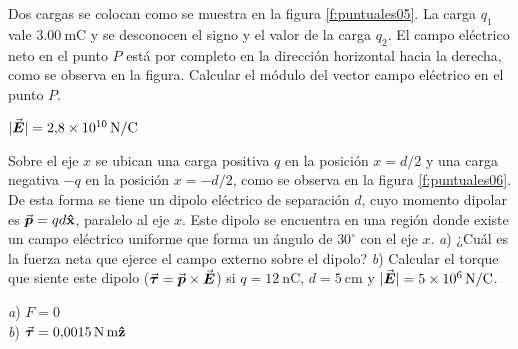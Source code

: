 %
\begin{Exercise}\label{p:puntuales05}
  Dos cargas se colocan como se muestra en la figura \ref{f:puntuales05}. La carga $q_1$ vale $\SI{3.00}{\milli\coulomb}$ y se desconocen el signo y el valor de la carga $q_2$. El campo eléctrico neto en el punto $P$ está por completo en la dirección horizontal hacia la derecha, como se observa en la figura. Calcular el módulo del vector campo eléctrico en el punto $P$.
\end{Exercise}
\begin{Answer}
  $|\va*{E}| = \SI{2.8E10}{\newton/\coulomb}$
\end{Answer}
%
\begin{Exercise}\label{p:puntuales06}
  Sobre el eje $x$ se ubican una carga positiva $q$ en la posición $x = d/2$ y una carga negativa $-q$ en la posición $x = -d/2$, como se observa en la figura \ref{f:puntuales06}. De esta forma se tiene un dipolo eléctrico de separación $d$, cuyo momento dipolar es $\va*{p}=qd\vu{x}$, paralelo al eje $x$. Este dipolo se encuentra en una región donde existe un campo eléctrico uniforme que forma un ángulo de $30^\circ$ con el eje $x$. \textit{a}) ¿Cuál es la fuerza neta que ejerce el campo externo sobre el dipolo? \textit{b}) Calcular el torque que siente este dipolo ($\va*{\tau} = \va*{p} \times \va*{E}$) si $q = \SI{12}{\nano\coulomb}$, $d = \SI{5}{\centi\metre}$ y $|\va*{E}| = \SI{5E6}{\newton/\coulomb}$.
\end{Exercise}
\begin{Answer}
  \begin{minipage}[t]{.4\textwidth}
    \textit{a}) $F = 0$\\ \textit{b}) $\va*{\tau} = \SI{0.0015}{\newton.\metre}\vu{z}$
  \end{minipage}
\end{Answer}
%
\begin{minipage}[t]{.5\textwidth}
  \begin{center}
  \end{center}
\end{minipage}
